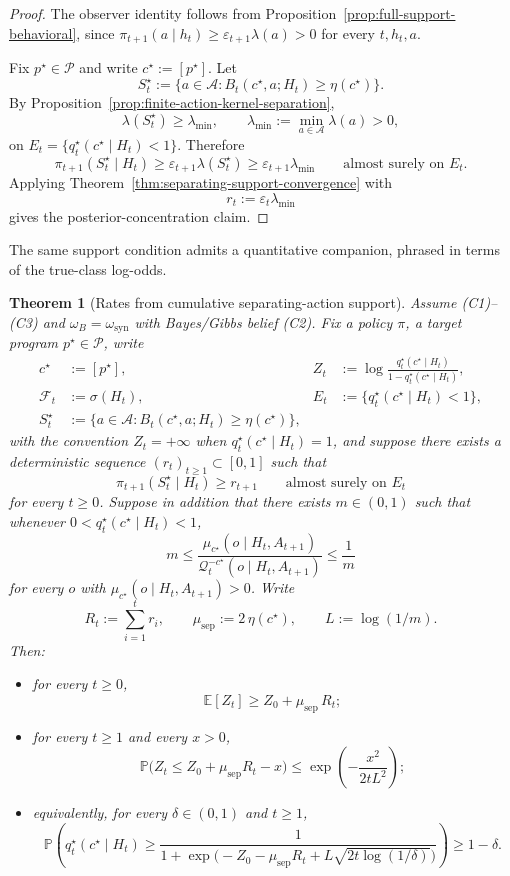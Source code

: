 \documentclass[11pt]{article}
\newtheorem{theorem}{Theorem}[section]
\theoremstyle{definition}
\theoremstyle{remark}
\newcommand{\Acal}{\mathcal{A}}
\newcommand{\Pcal}{\mathcal{P}}
\newcommand{\Qcal}{\mathcal{Q}}
\newcommand{\E}{\mathbb{E}}
\newcommand{\Prob}{\mathbb{P}}
\begin{document}
\begin{proof}
The observer identity follows from Proposition~\ref{prop:full-support-behavioral}, since $\pi_{t+1}(a\mid h_t)\ge \varepsilon_{t+1}\lambda(a)>0$ for every $t,h_t,a$.

Fix $p^\star\in\Pcal$ and write $c^\star:=[p^\star]$. Let
\[
S_t^\star:=\{a\in\Acal:B_t(c^\star,a;H_t)\ge \eta(c^\star)\}.
\]
By Proposition~\ref{prop:finite-action-kernel-separation},
\[
\lambda(S_t^\star)\ge \lambda_{\min},
\qquad
\lambda_{\min}:=\min_{a\in\Acal}\lambda(a)>0,
\]
on $E_t=\{q_t^\star(c^\star\mid H_t)<1\}$. Therefore
\[
\pi_{t+1}(S_t^\star\mid H_t)\ge \varepsilon_{t+1}\lambda(S_t^\star)\ge \varepsilon_{t+1}\lambda_{\min}
\qquad\text{almost surely on }E_t.
\]
Applying Theorem~\ref{thm:separating-support-convergence} with
\[
r_t:=\varepsilon_t\lambda_{\min}
\]
gives the posterior-concentration claim.
\end{proof}

The same support condition admits a quantitative companion, phrased in terms of the true-class log-odds.

\begin{theorem}[Rates from cumulative separating-action support]
\label{thm:separating-support-rate}
Assume \textup{(C1)--(C3)} and $\omega_B=\omega_{\mathrm{syn}}$ with Bayes/Gibbs belief \textup{(C2)}. Fix a policy $\pi$, a target program $p^\star\in\Pcal$, write
\[
\begin{aligned}
c^\star&:=[p^\star],
&
Z_t&:=\log\frac{q_t^\star(c^\star\mid H_t)}{1-q_t^\star(c^\star\mid H_t)},
\\
\mathcal F_t&:=\sigma(H_t),
&
E_t&:=\{q_t^\star(c^\star\mid H_t)<1\},
\\
S_t^\star&:=\{a\in\Acal:B_t(c^\star,a;H_t)\ge \eta(c^\star)\},
\end{aligned}
\]
with the convention $Z_t=+\infty$ when $q_t^\star(c^\star\mid H_t)=1$, and suppose there exists a deterministic sequence $(r_t)_{t\ge 1}\subset[0,1]$ such that
\[
\pi_{t+1}(S_t^\star\mid H_t)\ge r_{t+1}
\qquad\text{almost surely on }E_t
\]
for every $t\ge 0$. Suppose in addition that there exists $m\in(0,1)$ such that whenever $0<q_t^\star(c^\star\mid H_t)<1$,
\[
m\le
\frac{\mu_{c^\star}(o\mid H_t,A_{t+1})}{\Qcal_t^{-c^\star}(o\mid H_t,A_{t+1})}
\le \frac{1}{m}
\]
for every $o$ with $\mu_{c^\star}(o\mid H_t,A_{t+1})>0$. Write
\[
R_t:=\sum_{i=1}^t r_i,
\qquad
\mu_{\mathrm{sep}}:=2\,\eta(c^\star),
\qquad
L:=\log(1/m).
\]
Then:
\begin{itemize}
\item[(i)] for every $t\ge 0$,
\[
\E[Z_t]\ge Z_0+\mu_{\mathrm{sep}}\,R_t;
\]
\item[(ii)] for every $t\ge 1$ and every $x>0$,
\[
\Prob\!\bigl(Z_t\le Z_0+\mu_{\mathrm{sep}}R_t-x\bigr)
\le
\exp\!\left(-\frac{x^2}{2tL^2}\right);
\]
\item[(iii)] equivalently, for every $\delta\in(0,1)$ and $t\ge 1$,
\[
\Prob\!\left(
q_t^\star(c^\star\mid H_t)\ge
\frac{1}{1+\exp\!\bigl(-Z_0-\mu_{\mathrm{sep}}R_t+L\sqrt{2t\log(1/\delta)}\bigr)}
\right)\ge 1-\delta.
\]
\end{itemize}
\end{theorem}
\end{document}

